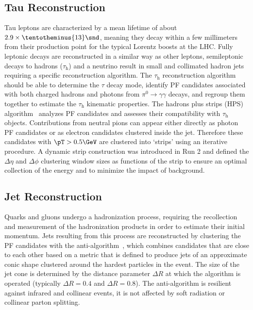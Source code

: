 \subsection{Tau Reconstruction}
\label{sec:tau_reco}
Tau leptons are characterized by a mean lifetime of about $2.9 \times \tentotheminus{13}\snd$, meaning they decay within a few millimeters from their production point for the typical Lorentz boosts at the LHC.
Fully leptonic decays are reconstructed in a similar way as other leptons, semileptonic decays to hadrons ($\tau_\text{h}$) and a neutrino result in small and collimated hadron jets requiring a specific reconstruction algorithm.
The $\tau_\text{h}$ reconstruction algorithm should be able to determine the $\tau$ decay mode, identify PF candidates associated with both charged hadrons and photons from $\pi^0 \rightarrow \gamma\gamma$ decays, and regroup them together to estimate the $\tau_\text{h}$ kinematic properties.
The hadrons plus strips (HPS) algorithm~\cite{hps_algo1, hps_algo2} analyzes PF candidates and assesses their compatibility with $\tau_\text{h}$ objects.
Contributions from neutral pions can appear either directly as photon PF candidates or as electron candidates clustered inside the jet.
Therefore these candidates with $\pT > 0.5\GeV$ are clustered into `strips' using an iterative procedure.
A dynamic strip construction was introduced in Run 2 and defined the $\Delta\eta$ and $\Delta\phi$ clustering window sizes as functions of the strip \pT to ensure an optimal collection of the energy and to minimize the impact of background.

\subsection{Jet Reconstruction}
\label{sec:jet_reco}
Quarks and gluons undergo a hadronization process, requiring the recollection and measurement of the hadronization products in order to estimate their initial momentum.
Jets resulting from this process are reconstructed by clustering the PF candidates with the anti-\kt algorithm~\cite{Cacciari:2008gp, Cacciari:2011ma},
which combines candidates that are close to each other based on a metric that is defined to produce jets of an approximate conic shape clustered around the hardest particles in the event.
The size of the jet cone is determined by the distance parameter $\Delta R$ at which the algorithm is operated (typically $\Delta R = 0.4$ and $ \Delta R = 0.8$).
The anti-\kt algorithm is resilient against infrared and collinear events, \ie it is not affected by soft radiation or collinear parton splitting. 


